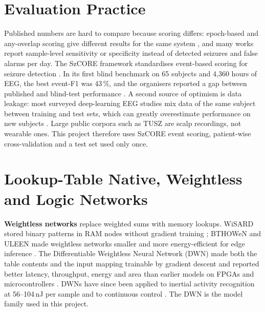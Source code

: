 \section{Evaluation Practice}\label{sec:lit-eval}

Published numbers are hard to compare because scoring differs: epoch-based and any-overlap scoring give different
results for the same system \cite{ziyabari2017metrics}, and many works report sample-level sensitivity or specificity
instead of detected seizures and false alarms per day. The SzCORE framework standardises event-based scoring for
seizure detection \cite{dan2024szcore}. In its first blind benchmark on 65 subjects and 4,360 hours of EEG, the best
event-F1 was 43\,\%, and the organisers reported a gap between published and blind-test performance
\cite{dan2025szcorechallenge}. A second source of optimism is data leakage: most surveyed deep-learning EEG studies mix
data of the same subject between training and test sets, which can greatly overestimate performance on new subjects
\cite{brookshire2024leakage}. Large public corpora such as TUSZ \cite{shah2018tusz} are scalp recordings, not
wearable ones. This project therefore uses SzCORE event scoring, patient-wise cross-validation and a test set used only
once.

\section{Lookup-Table Native, Weightless and Logic Networks}\label{sec:lit-lut}

\textbf{Weightless networks} replace weighted sums with memory lookups. WiSARD stored binary patterns in RAM nodes
without gradient training \cite{aleksander1984wisard}; BTHOWeN and ULEEN made weightless networks smaller and more
energy-efficient for edge inference \cite{susskind2022bthowen,susskind2023uleen}. The Differentiable Weightless Neural
Network (DWN) made both the table contents and the input mapping trainable by gradient descent and reported better
latency, throughput, energy and area than earlier models on FPGAs and microcontrollers \cite{bacellar2024dwn}. DWNs
have since been applied to inertial activity recognition at 56--104\,nJ per sample \cite{bacellar2025nanoml} and to
continuous control \cite{kresse2025dwc}. The DWN is the model family used in this project.

